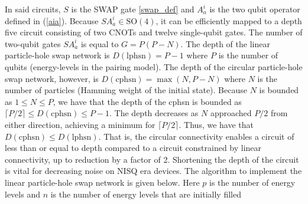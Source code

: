 \documentclass[Dual]{msu-thesis}
\begin{document}
In said circuits, $S$ is the SWAP gate \ref{swap_def} and $A^i_a$ is the two qubit operator defined in (\ref{aia}). Because $SA^i_a \in \text{SO}(4)$, it can be efficiently mapped \cite{ref:kak} to a depth five circuit consisting of two CNOTs and twelve single-qubit gates. The number of two-qubit gates $SA^i_a$ is equal to $G=P(P-N)$. The depth of the linear particle-hole swap network is $D(\text{lphsn})=P-1$ where $P$ is the number of qubits (energy-levels in the pairing model). The depth of the circular particle-hole swap network, however, is $D(\text{cphsn})=\max(N,P-N)$ where $N$ is the number of particles (Hamming weight of the initial state). Because $N$ is bounded as $1\leq N\leq P$, we have that the depth of the cphsn is bounded as $\lceil P/2 \rceil \leq D(\text{cphsn})\leq P-1$. The depth decreases as $N$ approached $P/2$ from either direction, achieving a minimum for $\lceil P/2 \rceil$. Thus, we have that $D(\text{cphsn})\leq D(\text{lphsn})$. That is, the circular connectivity enables a circuit of less than or equal to depth compared to a circuit constrained by linear connectivity, up to reduction by a factor of 2. Shortening the depth of the circuit is vital for decreasing noise on NISQ era devices. The algorithm to implement the linear particle-hole swap network is given below. Here $p$ is the number of energy levels and $n$ is the number of energy levels that are initially filled
\end{document}
